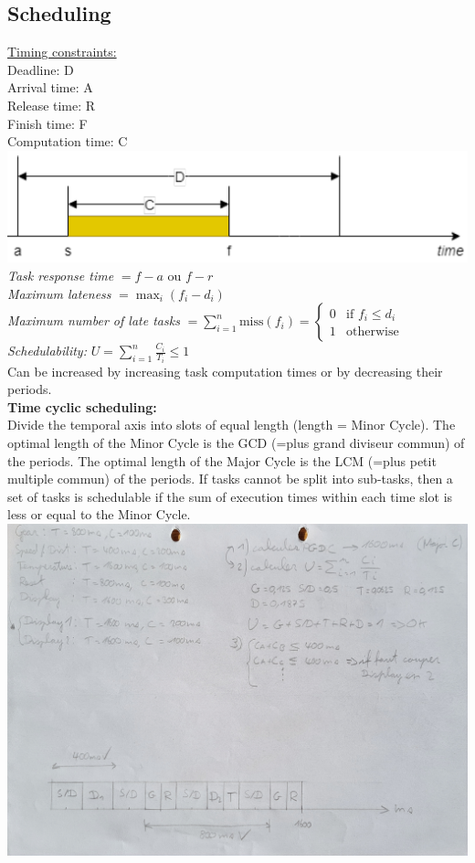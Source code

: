 \subsection*{Scheduling}
\underline{Timing constraints:}\\
Deadline: D\\
Arrival time: A\\
Release time: R\\
Finish time: F\\
Computation time: C\\
\includegraphics[width=\columnwidth]{images/timing_constraints.png}
\textit{Task response time} $=f-a$ ou $f-r$\\
\textit{Maximum lateness} $=\max_i(f_i-d_i)$\\
\textit{Maximum number of late tasks}
$=\sum_{i=1}^{n} \text{miss}(f_i)=
    \begin{cases}
        0 & \text{if } f_i \leq d_i \\
        1 & \text{otherwise}
    \end{cases}$\\
\textit{Schedulability:} $U=\sum_{i=1}^{n} \frac{C_i}{T_i} \leq 1$\\
Can be increased by increasing task computation times or by decreasing their periods.\\
\textbf{Time cyclic scheduling:}\\
Divide the temporal axis into slots of equal length (length = Minor Cycle).
The optimal length of the Minor Cycle is the GCD (=plus grand diviseur commun) of the periods.
The optimal length of the Major Cycle is the LCM (=plus petit multiple commun) of the periods.
If tasks cannot be split into sub-tasks, then a set of tasks is schedulable if
the sum of execution times within each time slot is less or equal to the Minor
Cycle.\\
\includegraphics[width=\columnwidth]{images/time_cyclic_scheduling.jpg}
